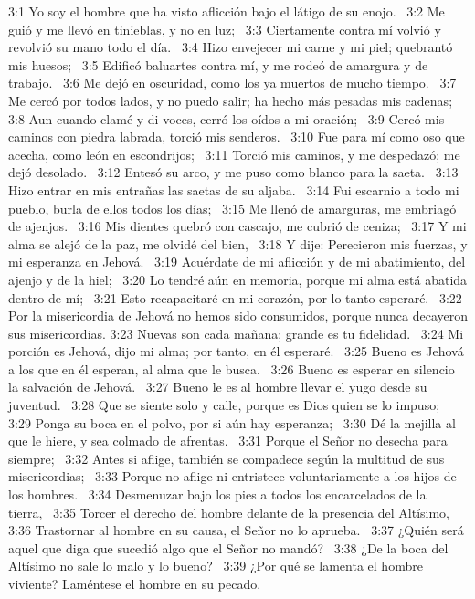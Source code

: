3:1 Yo soy el hombre que ha visto aflicción bajo el látigo de su enojo.  
3:2 Me guió y me llevó en tinieblas, y no en luz;  
3:3 Ciertamente contra mí volvió y revolvió su mano todo el día.  
3:4 Hizo envejecer mi carne y mi piel; quebrantó mis huesos;  
3:5 Edificó baluartes contra mí, y me rodeó de amargura y de trabajo.  
3:6 Me dejó en oscuridad, como los ya muertos de mucho tiempo.  
3:7 Me cercó por todos lados, y no puedo salir; ha hecho más pesadas mis cadenas;  
3:8 Aun cuando clamé y di voces, cerró los oídos a mi oración;  
3:9 Cercó mis caminos con piedra labrada, torció mis senderos.  
3:10 Fue para mí como oso que acecha, como león en escondrijos;  
3:11 Torció mis caminos, y me despedazó; me dejó desolado.  
3:12 Entesó su arco, y me puso como blanco para la saeta.  
3:13 Hizo entrar en mis entrañas las saetas de su aljaba.  
3:14 Fui escarnio a todo mi pueblo, burla de ellos todos los días;  
3:15 Me llenó de amarguras, me embriagó de ajenjos.  
3:16 Mis dientes quebró con cascajo, me cubrió de ceniza;  
3:17 Y mi alma se alejó de la paz, me olvidé del bien,  
3:18 Y dije: Perecieron mis fuerzas, y mi esperanza en Jehová.  
3:19 Acuérdate de mi aflicción y de mi abatimiento, del ajenjo y de la hiel;  
3:20 Lo tendré aún en memoria, porque mi alma está abatida dentro de mí;  
3:21 Esto recapacitaré en mi corazón, por lo tanto esperaré.  
3:22 Por la misericordia de Jehová no hemos sido consumidos, porque nunca decayeron sus misericordias. 
3:23 Nuevas son cada mañana; grande es tu fidelidad.  
3:24 Mi porción es Jehová, dijo mi alma; por tanto, en él esperaré.  
3:25 Bueno es Jehová a los que en él esperan, al alma que le busca.  
3:26 Bueno es esperar en silencio la salvación de Jehová.  
3:27 Bueno le es al hombre llevar el yugo desde su juventud.  
3:28 Que se siente solo y calle, porque es Dios quien se lo impuso;  
3:29 Ponga su boca en el polvo, por si aún hay esperanza;  
3:30 Dé la mejilla al que le hiere, y sea colmado de afrentas.  
3:31 Porque el Señor no desecha para siempre;  
3:32 Antes si aflige, también se compadece según la multitud de sus misericordias;  
3:33 Porque no aflige ni entristece voluntariamente a los hijos de los hombres.  
3:34 Desmenuzar bajo los pies a todos los encarcelados de la tierra,  
3:35 Torcer el derecho del hombre delante de la presencia del Altísimo,  
3:36 Trastornar al hombre en su causa, el Señor no lo aprueba.  
3:37 ¿Quién será aquel que diga que sucedió algo que el Señor no mandó?  
3:38 ¿De la boca del Altísimo no sale lo malo y lo bueno?  
3:39 ¿Por qué se lamenta el hombre viviente? Laméntese el hombre en su pecado.  
